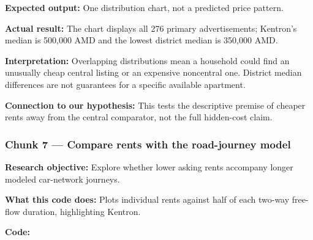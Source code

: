 \documentclass[
]{article}
\begin{document}
\textbf{Expected output:} One distribution chart, not a predicted price
pattern.

\textbf{Actual result:} The chart displays all 276 primary
advertisements; Kentron's median is 500,000 AMD and the lowest district
median is 350,000 AMD.

\textbf{Interpretation:} Overlapping distributions mean a household
could find an unusually cheap central listing or an expensive noncentral
one. District median differences are not guarantees for a specific
available apartment.

\textbf{Connection to our hypothesis:} This tests the descriptive
premise of cheaper rents away from the central comparator, not the full
hidden-cost claim.

\subsubsection{Chunk 7 --- Compare rents with the road-journey
model}\label{chunk-7-compare-rents-with-the-road-journey-model}

\textbf{Research objective:} Explore whether lower asking rents
accompany longer modeled car-network journeys.

\textbf{What this code does:} Plots individual rents against half of
each two-way free-flow duration, highlighting Kentron.

\textbf{Code:}
\end{document}
